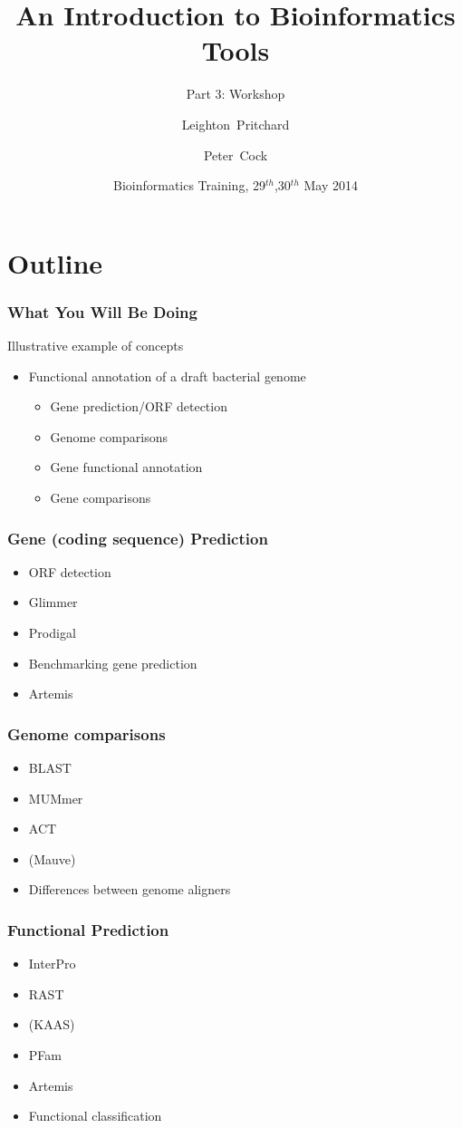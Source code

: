 \documentclass[table]{beamer}
\title[Intro to Bioinformatics] %
{An Introduction to Bioinformatics Tools}
\subtitle{Part 3: Workshop}
\author[Pritchard, Cock] %
{Leighton~Pritchard \and Peter~Cock}
\institute[The James Hutton Institute] %
{
  Information and Computational Sciences\\
  The James Hutton Institute
}
\date[May 2014] %
{Bioinformatics Training, 29$^{th}$,30$^{th}$ May 2014}
\begin{document}
  \frame[plain]{\titlepage}
  
\section{Outline}

    \begin{frame}
     \frametitle{What You Will Be Doing}
     Illustrative example of concepts
     \begin{itemize}
       \item Functional annotation of a draft bacterial genome
       \begin{itemize}
         \item Gene prediction/ORF detection
         \item Genome comparisons
         \item Gene functional annotation
         \item Gene comparisons
       \end{itemize}
     \end{itemize}
    \end{frame}

    \begin{frame}
     \frametitle{Gene (coding sequence) Prediction}
     \begin{itemize}
       \item ORF detection
       \item Glimmer
       \item Prodigal
       \item Benchmarking gene prediction
       \item Artemis
     \end{itemize}
    \end{frame}
    
    \begin{frame}
     \frametitle{Genome comparisons}
     \begin{itemize}
       \item BLAST
       \item MUMmer
       \item ACT
       \item (Mauve)
       \item Differences between genome aligners
     \end{itemize}
    \end{frame}

    \begin{frame}
     \frametitle{Functional Prediction}
     \begin{itemize}
       \item InterPro
       \item RAST
       \item (KAAS)
       \item PFam
       \item Artemis
       \item Functional classification
     \end{itemize}
    \end{frame}
    
\end{document}
